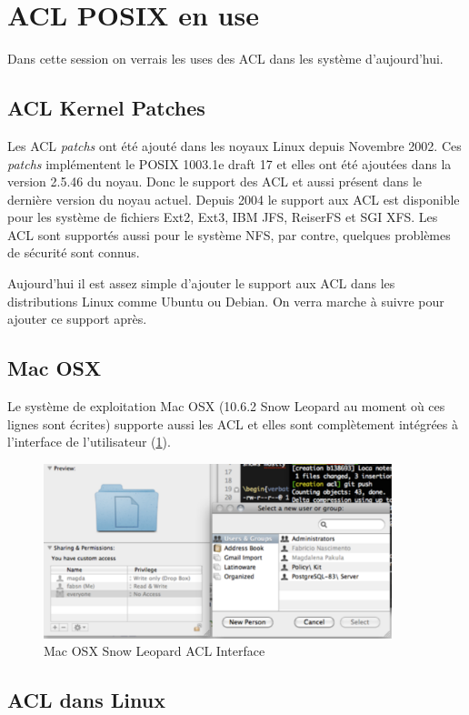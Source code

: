 \documentclass{article}
\begin{document}
\section{ACL POSIX en use}

Dans cette session on verrais les uses des ACL dans les système d'aujourd'hui. 

\subsection{ACL Kernel Patches}
Les ACL \emph{patchs} ont été ajouté dans les noyaux Linux depuis Novembre 2002. Ces \emph{patchs} implémentent le POSIX 1003.1e draft 17 et elles ont été ajoutées dans la version 2.5.46 du noyau. Donc le support des ACL et aussi présent dans le dernière version du noyau actuel. Depuis 2004 le support aux ACL est disponible pour les système de fichiers Ext2, Ext3, IBM JFS, ReiserFS et SGI XFS. Les ACL sont supportés aussi pour le système NFS, par contre, quelques problèmes de sécurité sont connus\cite{nfs_problem}. 

Aujourd'hui il est assez simple d'ajouter le support aux ACL dans les distributions Linux comme Ubuntu ou Debian. On verra marche à suivre pour ajouter ce support après.

\subsection{Mac OSX}
Le système de exploitation Mac OSX (10.6.2 Snow Leopard au moment où ces lignes sont écrites) supporte aussi les ACL et elles sont complètement intégrées à l'interface de l'utilisateur (\ref{fig:img_mac-acl}). 

\begin{figure}[htbp]
	\centering
		\includegraphics[height=2in]{img/mac-acl.pdf}
	\caption{Mac OSX Snow Leopard ACL Interface}
	\label{fig:img_mac-acl}
\end{figure}

\subsection{ACL dans Linux}
\end{document}
